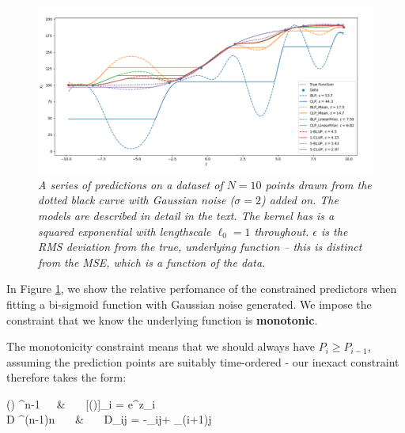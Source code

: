 \documentclass[]{article}
\begin{document}
		\begin{figure}[t]
			\includegraphics[width=\linewidth,keepaspectratio=true]{Figs/CLUP_comparison.png}
			\caption{\it A series of predictions on a dataset of $N=10$ points drawn from the dotted black curve with Gaussian noise ($\sigma=2$) added on. The models are described in detail in the text. The kernel has is a squared exponential with lengthscale $\ell_0 = 1$ throughout. $\epsilon$ is the RMS deviation from the true, underlying function -- this is distinct from the MSE, which is a function of the data.}\label{F:CLUP}
		\end{figure}

		

		In Figure \ref{F:CLUP}, we show the relative perfomance of the constrained predictors when fitting a bi-sigmoid function with Gaussian noise generated. We impose the constraint that we know the underlying function is \textbf{monotonic}.
		
		The monotonicity constraint means that we should always have $P_{i} \geq P_{i-1}$, assuming the prediction points are suitably time-ordered - our inexact constraint therefore takes the form:
		\begin{spalign}
			() \in {}^{n-1}~~~&~~~ 	[()]_i = e^{z_i}
			\\
			D \in {}^{(n-1)\times n} ~~~&~~~ D_{ij}  = -\delta_{ij}+ \delta_{(i+1)j}\label{E:CLP_Monotone}
		\end{spalign}
\end{document}
